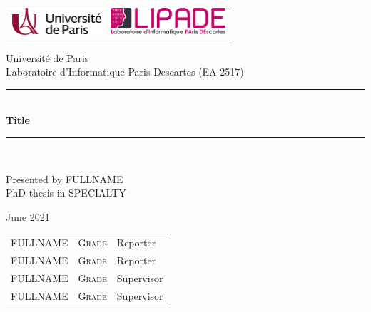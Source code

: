 \documentclass[12pt]{book}
\newcommand{\HRule}{\rule{\linewidth}{0.7mm}}
\newcommand{\Hrule}{\rule{\linewidth}{0.3mm}}
\begin{document}
	
	\begin{titlepage}
		\begin{center}
			\begin{tabular}{c@{\hskip 3cm}c}
				\includegraphics[height=1cm]{images/Universite_Paris_logo_horizontal_2000px.png} &
				\includegraphics[height=1cm]{images/LIPADE.png}\\
			\end{tabular}
		\end{center}
	
		
		\begin{center}

			Université de Paris\\
			Laboratoire d’Informatique Paris Descartes (EA 2517)
  
  			\vfill
  			
	 		\HRule \\[0.1cm]
	 		 { \Large \bfseries Title	 }
	  		\Hrule \\
		
		\end{center}
		
		\vfill
			
		\begin{center}
			Presented by \textsc{\Large FULLNAME}\\[1cm] 
			PhD thesis in \textsc{\large SPECIALTY}\\[1cm]
		
	
			
			\vspace{1cm}
	
			June 2021
		\end{center}
		
		\vspace{1cm}
			
		
		\begin{center}
			\begin{tabular}{lll}
				 \textsc{FULLNAME}  &  \textsc{Grade} & Reporter\\
				\textsc{FULLNAME}  &  \textsc{Grade} & Reporter \\
				\textsc{FULLNAME}  &  \textsc{Grade} & Supervisor\\
				\textsc{FULLNAME}  &  \textsc{Grade} & Supervisor \\
				
			\end{tabular}\\[1cm]
		\end{center}

	\newpage
	\end{titlepage}
\end{document}
